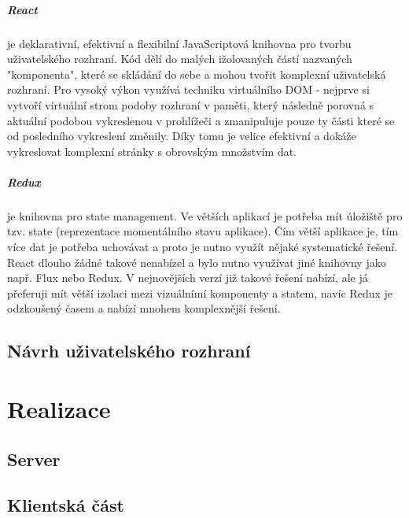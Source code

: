 \documentclass[thesis=B,czech]{FITthesis}[2019/12/23]
\begin{document}
\paragraph{React} je deklarativní, efektivní a flexibilní JavaScriptová knihovna pro tvorbu uživatelského rozhraní. Kód dělí do malých ižolovaných částí nazvaných "komponenta", které se skládání do sebe a mohou tvořit komplexní uživatelská rozhraní. Pro vysoký výkon využívá techniku virtuálního DOM - nejprve si vytvoří virtuální strom podoby rozhraní v paměti, který následně porovná s aktuální podobou vykreslenou v prohlížeči a zmanipuluje pouze ty části které se od posledního vykreslení změnily. Díky tomu je velice efektivní a dokáže vykreslovat komplexní stránky s obrovským množstvím dat.

\paragraph{Redux} je knihovna pro state management. Ve větších aplikací je potřeba mít úložiště pro tzv. state (reprezentace momentálního stavu aplikace). Čím větší aplikace je, tím více dat je potřeba uchovávat a proto je nutno využít nějaké systematické řešení. React dlouho žádné takové nenabízel a bylo nutno využívat jiné knihovny jako např. Flux nebo Redux. V nejnovějších verzí již takové řešení nabízí, ale já přeferuji mít větší izolaci mezi vizuálnímí komponenty a statem, navíc Redux je odzkoušený časem a nabízí mnohem komplexnější řešení.


\section{Návrh uživatelského rozhraní}




\chapter{Realizace}

\section{Server}

\section{Klientská část}
\end{document}
